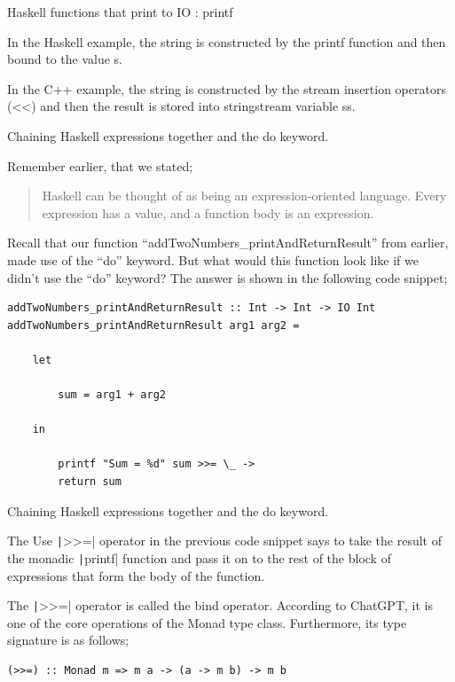 \begin{frame}[t, fragile]{Haskell functions that print to IO : printf}

In the Haskell example, the string is constructed by the printf function and then bound to the value s.

In the C++ example, the string is constructed by the stream insertion operators (<<) and then the result is stored into
stringstream variable ss.

\end{frame}


\begin{frame}[t, fragile]{Chaining Haskell expressions together and the do keyword.}

Remember earlier, that we stated; \\

\begin{quote}
Haskell can be thought of as being an expression-oriented language. Every expression has a value, and a function body is
an expression.
\end{quote}

Recall that our function ``addTwoNumbers\_printAndReturnResult'' from earlier, made use of the ``do'' keyword. But what
would this function look like if we didn't use the ``do'' keyword? The answer is shown in the following code snippet;

\begin{verbatim}
addTwoNumbers_printAndReturnResult :: Int -> Int -> IO Int
addTwoNumbers_printAndReturnResult arg1 arg2 =

    let

        sum = arg1 + arg2

    in

        printf "Sum = %d" sum >>= \_ ->
        return sum
\end{verbatim}

\end{frame}


\begin{frame}[t, fragile]{Chaining Haskell expressions together and the do keyword.}

The Use \texttt|>>=| operator in the previous code snippet says to take the result of the monadic
\texttt|printf| function and pass it on to the rest of the block of expressions that form the body of the
function.

The \texttt|>>=| operator is called the bind operator. According to ChatGPT, it is one of the core operations
of the Monad type class. Furthermore, its type signature is as follows;

\begin{verbatim}
(>>=) :: Monad m => m a -> (a -> m b) -> m b
\end{verbatim}

\end{frame}

